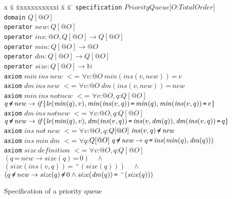 \documentclass{article}
\theoremstyle{remark}
\theoremstyle{definition}
\newcommand{\ieq}{\,\texttt{=}\,}
\newcommand{\ineq}{\,\texttt{=\hspace{-0.16cm}/\hspace{-0.01cm}}\,}
\newcommand{\iiff}{\mathit{if}}
\newcommand{\nat}{\mathbb{N}}
\newcommand{\name}[1]{\mathit{#1}}
\begin{document}
\begin{figure}[t]
\begin{tabbing}
x \= x \= xxxxxxxxxxxi \= x \= x \= \kill
\texttt{specification} $\name{PriorityQueue}[O$:$\name{TotalOrder}]$ \\
\> \texttt{domain} $Q[@O]$ \\
\> \texttt{operator} $\name{new}: Q[@O]$ \\
\> \texttt{operator} $\name{ins}: @O,Q[@O] \rightarrow Q[@O]$ \\
\> \texttt{operator} $\name{min}: Q[@O] \rightarrow @O$ \\
\> \texttt{operator} $\name{dm}: Q[@O] \rightarrow Q[@O]$ \\
\> \texttt{operator} $\name{size}: Q[@O] \rightarrow \nat$ \\
\> \texttt{axiom} $\name{min}\ \name{ins}\ \name{new}$ $<$= $\forall v$:$@O\ \name{min}(\name{ins}(v,\name{new}))\ieq v$ \\
\> \texttt{axiom} $\name{dm}\ \name{ins}\ \name{new}$ $<$= $\forall v$:$@O\ \name{dm}(\name{ins}(v,\name{new}))\ieq \name{new}$ \\
\> \texttt{axiom} $\name{min}\ \name{ins}\ \name{notnew}$ $<$= $\forall v$:$@O, q$:$Q[@O]$ \\
\> \> $q \ineq \name{new} \rightarrow \iiff\{\name{le}(\name{min}(q),v),\name{min}(\name{ins}(v,q))\ieq\name{min}(q),\name{min}(\name{ins}(v,q))\ieq v\}$ \\
\> \texttt{axiom} $\name{dm}\ \name{ins}\ \name{notnew}$ $<$= $\forall v$:$@O, q$:$Q[@O]$ \\
\> \> $q \ineq \name{new} \rightarrow \iiff\{\name{le}(\name{min}(q),v), \name{dm}(\name{ins}(v,q))\ieq\name{ins}(v,\name{dm}(q)), \name{dm}(\name{ins}(v,q))\ieq q\}$ \\
\> \texttt{axiom} $\name{ins}\ \name{not}\ \name{new}$ $<$= $\forall v$:$@O, q$:$Q[@O]\ \name{ins}(v,q) \ineq \name{new}$ \\
\> \texttt{axiom} $\name{ins}\ \name{min}\ \name{dm}$ $<$= $\forall q$:$Q[@O]\ q \ineq \name{new} \rightarrow q\ieq\name{ins}(\name{min}(q),\name{dm}(q)))$ \\
\> \texttt{axiom} $\name{size}\ \name{definition}$ $<$= $\forall v$:$@O, q$:$Q[@O]$ \\
\> \> $(q\ieq\name{new} \rightarrow \name{size}(q)\ieq 0) \quad \wedge$ \\
\> \> $(\name{size}(\name{ins}(v,q))\ieq \,^+(\name{size}(q))) \quad \wedge$ \\
\> \> $(q \ineq \name{new} \rightarrow \name{size}(q) \ineq 0 \wedge
\name{size}(\name{dm}(q))\ieq\,^-(\name{size}(q)))$
\end{tabbing}
\caption{Specification of a priority queue} \label{fig:pqueue}
\end{figure}
\end{document}
